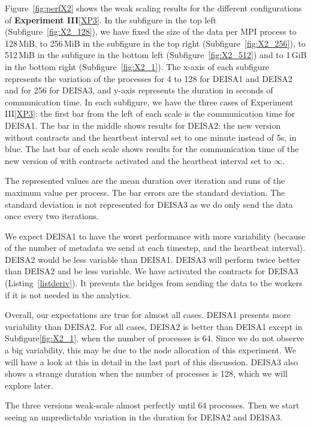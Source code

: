 Figure~\ref{fig:perfX2} shows the weak scaling results for the different configurations of \textbf{Experiment III}\ref{XP3}. 
In the subfigure in the top left (Subfigure~\ref{fig:X2_128}), we have fixed the size of the data per MPI process to 128\,MiB, to 256\,MiB in the subfigure in the top right (Subfigure~\ref{fig:X2_256}), to 512\,MiB in the subfigure in the bottom left (Subfigure~\ref{fig:X2_512}) and to 1\,GiB in the bottom right (Subfigure~\ref{fig:X2_1}). 
The x-axis of each subfigure represents the variation of the processes for 4 to 128 for DEISA1 and DEISA2 and for 256 for DEISA3, and y-axis represents the duration in seconds of communication time. 
In each subfigure, we have the three cases of Experiment III\ref{XP3}: the first bar from the left of each scale  is the communication time for DEISA1. The bar in the middle shows results for DEISA2: the new version without contracts and the heartbeat interval set to one minute instead of 5s, in blue. The last bar of each scale shows results for the communication time of the new version of \deisa with contracts activated and the heartbeat interval set to $\infty$.

The represented values are the mean duration over iteration and runs of the maximum value per process. The bar errors are the standard deviation. The standard deviation is not represented for DEISA3 as we do only send the data once every two iterations.

We expect DEISA1 to have the worst performance with more variability (because of the number of metadata we send at each timestep, and the heartbeat interval). DEISA2 would be less variable than DEISA1. 
DEISA3 will perform twice better than DEISA2 and be less variable. 
We have activated the contracts for DEISA3 (Listing~\ref{listderiv}). It prevents the bridges from sending the data to the workers if it is not needed in the analytics. 

Overall, our expectations are true for almost all cases. DEISA1 presents more variability than DEISA2. For all cases, DEISA2 is better than DEISA1 except in Subfigure\ref{fig:X2_1}, when the number of processes is 64. Since we do not observe a big variability, this may be due to the node allocation of this experiment. We will have a look at this in detail in the last part of this discussion.
DEISA3 also shows a strange duration when the number of processes is 128, which we will explore later.

The three versions weak-scale almost perfectly until 64 processes. Then we start seeing an unpredictable variation in the duration for DEISA2 and DEISA3.  

